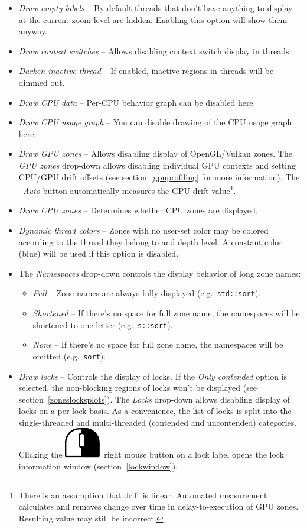 \documentclass[hidelinks,titlepage,a4paper]{article}
\newcommand{\RMB}{\includegraphics[height=.8\baselineskip]{icons/rmb}}
\begin{document}
\begin{itemize}
\item \emph{\faExpand{} Draw empty labels} -- By default threads that don't have anything to display at the current zoom level are hidden. Enabling this option will show them anyway.
\item \emph{\faHiking{} Draw context switches} -- Allows disabling context switch display in threads.
\item \emph{\faMoon{} Darken inactive thread} -- If enabled, inactive regions in threads will be dimmed out.
\item \emph{\faSlidersH{} Draw CPU data} -- Per-CPU behavior graph can be disabled here.
\item \emph{\faSignature{} Draw CPU usage graph} -- You can disable drawing of the CPU usage graph here.
\item \emph{\faEye{} Draw GPU zones} -- Allows disabling display of OpenGL/Vulkan zones. The \emph{GPU zones} drop-down allows disabling individual GPU contexts and setting CPU/GPU drift offsets (see section~\ref{gpuprofiling} for more information). The \emph{\faRobot~Auto} button automatically measures the GPU drift value\footnote{There is an assumption that drift is linear. Automated measurement calculates and removes change over time in delay-to-execution of GPU zones. Resulting value may still be incorrect.}.
\item \emph{\faMicrochip{} Draw CPU zones} -- Determines whether CPU zones are displayed.
\item \emph{\faPalette{} Dynamic thread colors} -- Zones with no user-set color may be colored according to the thread they belong to and depth level. A constant color (blue) will be used if this option is disabled.
\item The \emph{Namespaces} drop-down controls the display behavior of long zone names:
\begin{itemize}
\item \emph{Full} -- Zone names are always fully displayed (e.g.\ \texttt{std::sort}).
\item \emph{Shortened} -- If there's no space for full zone name, the namespaces will be shortened to one letter (e.g.\ \texttt{s::sort}).
\item \emph{None} -- If there's no space for full zone name, the namespaces will be omitted (e.g.\ \texttt{sort}).
\end{itemize}
\item \emph{\faLock{} Draw locks} -- Controls the display of locks. If the \emph{Only contended} option is selected, the non-blocking regions of locks won't be displayed (see section~\ref{zoneslocksplots}). The \emph{Locks} drop-down allows disabling display of locks on a per-lock basis. As a convenience, the list of locks is split into the single-threaded and multi-threaded (contended and uncontended) categories. Clicking the \RMB{}~right mouse button on a lock label opens the lock information window (section~\ref{lockwindow}).

\end{itemize}
\end{document}
